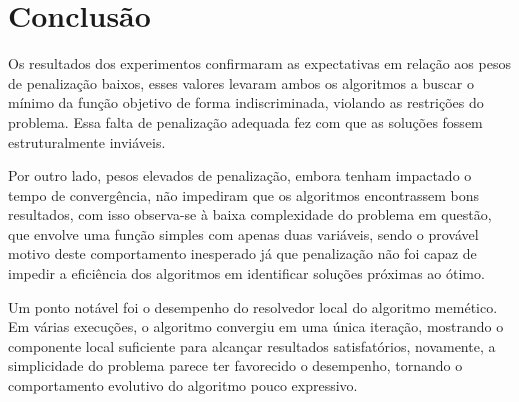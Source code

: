 \section{Conclusão}%
\label{sec:conclusao}

Os resultados dos experimentos confirmaram as expectativas em relação aos pesos de penalização baixos, esses valores levaram ambos os algoritmos a buscar o mínimo da função objetivo de forma indiscriminada, violando as restrições do problema. Essa falta de penalização adequada fez com que as soluções fossem estruturalmente inviáveis.

Por outro lado, pesos elevados de penalização, embora tenham impactado o tempo de convergência, não impediram que os algoritmos encontrassem bons resultados, com isso observa-se à baixa complexidade do problema em questão, que envolve uma função simples com apenas duas variáveis, sendo o provável motivo deste comportamento inesperado já que penalização não foi capaz de impedir a eficiência dos algoritmos em identificar soluções próximas ao ótimo.

Um ponto notável foi o desempenho do resolvedor local do algoritmo memético. Em várias execuções, o algoritmo convergiu em uma única iteração, mostrando o componente local suficiente para alcançar resultados satisfatórios, novamente, a simplicidade do problema parece ter favorecido o desempenho, tornando o comportamento evolutivo do algoritmo pouco expressivo.